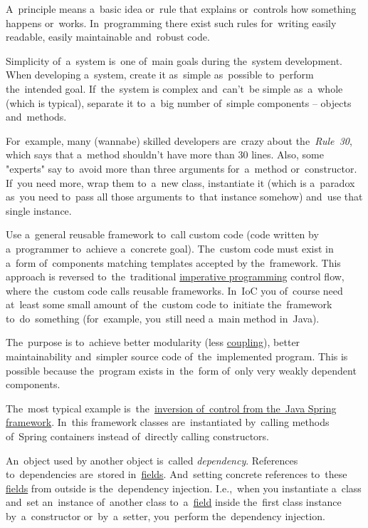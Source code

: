 A~principle means a~basic idea or~rule that explains or~controls how something happens or~works.
In~programming there exist such rules for~writing easily readable, easily maintainable and~robust code.

Simplicity of~a~system is~one of~main goals during the~system development.
When developing a~system, create it as~simple as~possible to~perform the~intended goal.
If~the~system is complex and~can't~be simple as~a~whole (which is typical), separate it to~a~big number of~simple components -- objects and~methods.

For~example, many (wannabe) skilled developers are~crazy about the~\textit{Rule~30}, which says that a~method shouldn't have more than 30 lines.
Also, some "experts" say to~avoid more than three arguments for~a~method or~constructor.
If~you need more, wrap them to~a~new class, instantiate it (which is a~paradox as~you need to~pass all those arguments to~that instance somehow) and~use that single instance.

\label{inversionofcontrol}
Use a~general reusable framework to~call custom code (code written by a~programmer to~achieve a~concrete goal).
The~custom code must exist in a~form of~components matching templates accepted by the~framework.
This approach is reversed to~the~traditional \hyperref[imperativeprogramming]{imperative programming} control flow, where the~custom code calls reusable frameworks.
In~IoC you of~course need at~least some small amount of~the~custom code to~initiate the~framework to~do~something (for~example, you~still need a~main method in~Java).

The~purpose is to~achieve better modularity (less \hyperref[loosetightcoupling]{coupling}), better maintainability and~simpler source code of~the~implemented program.
This is possible because the~program exists in~the~form of~only very weakly dependent components.

The~most typical example is~the~\hyperref[springinversionofcontrol]{inversion of~control from the~Java Spring framework}.
In~this framework classes are~instantiated by~calling methods of~Spring containers instead of~directly calling constructors.

\label{dependencyinjection}
An~object used by another object is~called \textit{dependency}.
References to~dependencies are~stored in~\hyperref[variablefieldproperty]{fields}.
And~setting concrete references to~these \hyperref[variablefieldproperty]{fields} from outside is the~dependency injection.
I.e.,~when you instantiate a~class and~set an~instance of~another class to~a~\hyperref[variablefieldproperty]{field} inside the~first class instance by~a~constructor or~by~a~setter, you~perform the~dependency injection.

